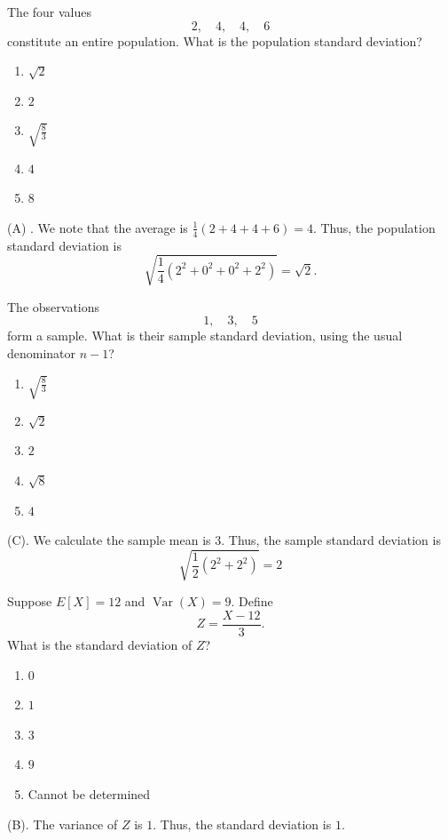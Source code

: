 \begin{exercise}
The four values
\[
2,\quad4,\quad4,\quad6
\]
constitute an entire population. What is the population standard deviation?
\begin{enumerate}[label=(\Alph*)]
\item $\sqrt2$
\item $2$
\item $\sqrt{\frac83}$
\item $4$
\item $8$
\end{enumerate}
\end{exercise}
\begin{solution}
(A) . We note that the average is $\frac{1}{4}(2 + 4 + 4 + 6) = 4$. Thus, the 
population standard deviation is 
\[
\sqrt{\frac{1}{4}(2^2 + 0^2 + 0^2 + 2^2)} = \sqrt{2}.
\]
\end{solution}

\begin{exercise}
The observations
\[
1,\quad3,\quad5
\]
form a sample. What is their sample standard deviation,
using the usual denominator $n-1$?
\begin{enumerate}[label=(\Alph*)]
\item $\sqrt{\frac83}$
\item $\sqrt2$
\item $2$
\item $\sqrt8$
\item $4$
\end{enumerate}
\end{exercise}
\begin{solution}
(C). We calculate the sample mean is $3$. Thus, the sample standard deviation is
\[
\sqrt{\frac{1}{2}(2^2 + 2^2)} = 2
\]
\end{solution}

\begin{exercise}
Suppose $E[X]=12$ and $\operatorname{Var}(X)=9$. 
Define
\[
Z=\frac{X-12}{3}.
\]
What is the standard deviation of $Z$?
\begin{enumerate}[label=(\Alph*)]
\item $0$
\item $1$
\item $3$
\item $9$
\item Cannot be determined
\end{enumerate}
\end{exercise}
\begin{solution}
(B). The variance of $Z$ is $1$. Thus, the standard deviation is $1$.
\end{solution}

